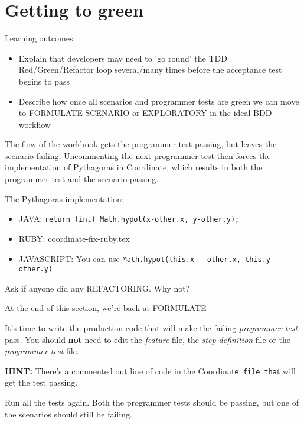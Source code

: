 \chapter*{Getting to green}

\ifnotes

    Learning outcomes:
    
    \begin{itemize}
        \item Explain that developers may need to 'go round' the TDD Red/Green/Refactor loop several/many times before the acceptance test begins to pass
        \item Describe how once all scenarios and programmer tests are green we can move to  FORMULATE SCENARIO or EXPLORATORY in the ideal BDD workflow
    \end{itemize}
    
    The flow of the workbook gets the programmer test passing, but leaves the scenario failing. Uncommenting the next programmer test then forces the implementation of Pythagoras in Coordinate, which results in both the programmer test and the scenario passing.
    
    The Pythagoras implementation:
    \begin{itemize}
        \item JAVA: \texttt{return (int) Math.hypot(x-other.x, y-other.y);}
        \item RUBY:
        {coordinate-fix-ruby.tex}
        \item JAVASCRIPT: You can use \texttt{Math.hypot(this.x - other.x, this.y - other.y)}
    \end{itemize} 
    
    Ask if anyone did any REFACTORING. Why not?
    
    At the end of this section, we're back at FORMULATE
    
\fi

\ifcontent 
    It's time to write the production code that will make the failing \emph{programmer test} pass. You should \textbf{\underline{not}} need to edit the \emph{feature} file, the \emph{step definition} file or the \emph{programmer test} file.
    
    \textbf{HINT:} There's a commented out line of code in the Coordinat\texttt{e file tha}t will get the test passing.
    
    Run all the tests again. Both the programmer tests should be passing, but one of the scenarios should still be failing.
    
